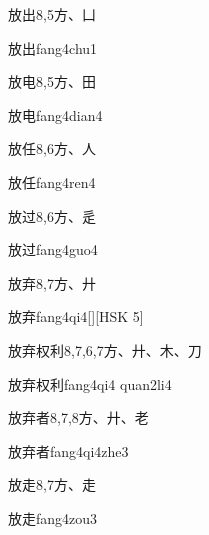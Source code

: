 \begin{Entry}{放出}{8,5}{⽅、⼐}
  \begin{Phonetics}{放出}{fang4chu1}
  \end{Phonetics}
\end{Entry}

\begin{Entry}{放电}{8,5}{⽅、⽥}
  \begin{Phonetics}{放电}{fang4dian4}
  \end{Phonetics}
\end{Entry}

\begin{Entry}{放任}{8,6}{⽅、⼈}
  \begin{Phonetics}{放任}{fang4ren4}
  \end{Phonetics}
\end{Entry}

\begin{Entry}{放过}{8,6}{⽅、⾡}
  \begin{Phonetics}{放过}{fang4guo4}
  \end{Phonetics}
\end{Entry}

\begin{Entry}{放弃}{8,7}{⽅、⼶}
  \begin{Phonetics}{放弃}{fang4qi4}[][HSK 5]
  \end{Phonetics}
\end{Entry}

\begin{Entry}{放弃权利}{8,7,6,7}{⽅、⼶、⽊、⼑}
  \begin{Phonetics}{放弃权利}{fang4qi4 quan2li4}
  \end{Phonetics}
\end{Entry}

\begin{Entry}{放弃者}{8,7,8}{⽅、⼶、⽼}
  \begin{Phonetics}{放弃者}{fang4qi4zhe3}
  \end{Phonetics}
\end{Entry}

\begin{Entry}{放走}{8,7}{⽅、⾛}
  \begin{Phonetics}{放走}{fang4zou3}
  \end{Phonetics}
\end{Entry}

